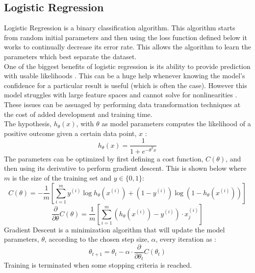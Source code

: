 \documentclass[titlepage]{article}
\begin{document}
\subsection{Logistic Regression}
Logistic Regression is a binary classification algorithm. This algorithm starts from random initial parameters and then using the loss function defined below it works to continually decrease its error rate. This allows the algorithm to learn the parameters which best separate the dataset.\\
One of the biggest benefits of logistic regression is its ability to provide prediction with usable likelihoods \cite{LogisticRegressionOG}. This can be a huge help whenever knowing the model's confidence for a particular result is useful (which is often the case). However this model struggles with large feature spaces and cannot solve for nonlinearities \cite{LogisticRegressionDimensionaliy}. These issues can be assuaged by performing data transformation techniques at the cost of added development and training time.\\
The hypothesis, $h_\theta(x)$, with $\theta$ as model parameters computes the likelihood of a positive outcome given a certain data point, $x$ \cite{LogisticRegressionOG}:
$$h_\theta(x) = \frac{1}{1 + e^{-\theta^T x}}$$
The parameters can be optimized by first defining a cost function, $C(\theta)$, and then using its derivative to perform gradient descent. This is shown below where $m$ is the size of the training set and $y \in \{0, 1\}$\cite{LogisticRegressionMath}:
$$C(\theta) = -\frac{1}{m}\left[\sum\limits_{i=1}^m y^{(i)} \log h_\theta(x^{(i)}) + (1-y^{(i)})\log(1-h_\theta(x^{(i)}))\right]$$
$$\frac{\partial}{\partial\theta}C(\theta) = \frac{1}{m}\left[\sum\limits_{i=1}^m (h_\theta(x^{(i)}) - y^{(i)})\cdot x_j^{(i)}\right]$$
Gradient Descent is a minimization algorithm that will update the model parameters, $\theta$, according to the chosen step size, $\alpha$, every iteration as \cite{LogisticRegressionMath}:
$$\theta_{t+1} = \theta_t-\alpha\cdot\frac{\partial}{\partial\theta_t}C(\theta_t)$$
Training is terminated when some stopping criteria is reached.
\end{document}

